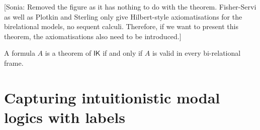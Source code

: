 \documentclass[twoside]{aiml18}
\newcommand{\sonia}[1]{{\color{blue}[Sonia: #1]}}
\newcommand*{\IK}{\mathsf{IK}}
\begin{document}
\sonia{Removed the figure as it has nothing to do with the theorem. Fisher-Servi as well as Plotkin and Sterling only give Hilbert-style axiomatisations for the birelational models, no sequent calculi.
Therefore, if we want to present this theorem, the axiomatisations also need to be introduced.}

\begin{theorem}
	A formula $A$ is a theorem of $\IK$ if and only if $A$ is valid in every bi-relational frame.
\end{theorem}


\section{Capturing intuitionistic modal logics with labels}
\end{document}
